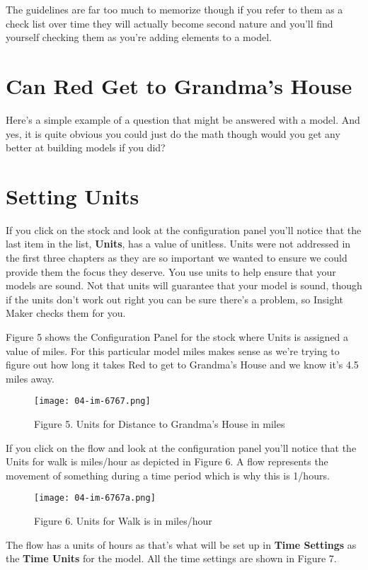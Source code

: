 \documentclass[]{memoir}
\let\Oldincludegraphics\includegraphics
\renewcommand{\includegraphics}[1]{\Oldincludegraphics[max size={\textwidth}{\textheight}]{#1}}
\renewcommand{\u}[1]{\textbf{#1}}
\renewcommand{\a}[1]{\textbf{#1}}
\begin{document}
The guidelines are far too much to memorize though if you refer to them
as a check list over time they will actually become second nature and
you'll find yourself checking them as you're adding elements to a model.

\section{Can Red Get to Grandma's House}

Here's a simple example of a question that might be answered with a
model. And yes, it is quite obvious you could just do the math though
would you get any better at building models if you did?

\section{Setting Units}

If you click on the stock and look at the configuration panel you'll
notice that the last item in the list, \a{Units}, has a value of
unitless. Units were not addressed in the first three chapters as they
are so important we wanted to ensure we could provide them the focus
they deserve. You use units to help ensure that your models are sound.
Not that units will guarantee that your model is sound, though if the
units don't work out right you can be sure there's a problem, so Insight
Maker checks them for you.

Figure 5 shows the Configuration Panel for the stock where Units is
assigned a value of miles. For this particular model miles makes sense
as we're trying to figure out how long it takes Red to get to Grandma's
House and we know it's 4.5 miles away.

\begin{figure}[htbp]
\centering
\texttt{[image: 04-im-6767.png]}
\caption{Figure 5. Units for Distance to Grandma's House in miles}
\end{figure}

If you click on the flow and look at the configuration panel you'll
notice that the Units for walk is miles/hour as depicted in Figure 6. A
flow represents the movement of something during a time period which is
why this is 1/hours.

\begin{figure}[htbp]
\centering
\texttt{[image: 04-im-6767a.png]}
\caption{Figure 6. Units for Walk is in miles/hour}
\end{figure}

The flow has a units of hours as that's what will be set up in
\u{Time Settings} as the \u{Time Units} for the model. All the time
settings are shown in Figure 7.
\end{document}
